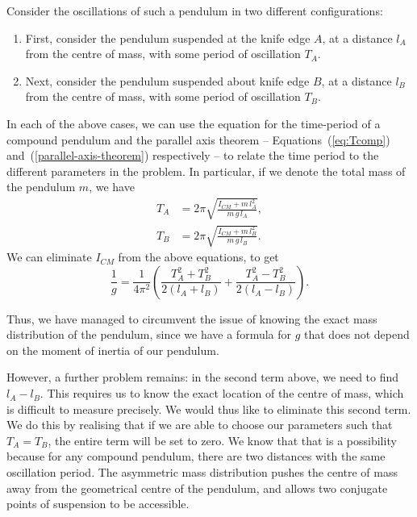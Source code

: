    
Consider the oscillations of such a pendulum in two different configurations:
\vspace{-\parskip}
\begin{enumerate}
    \item First, consider the pendulum suspended at the knife edge $A$, at a distance $l_A$ from the centre of mass, with some period of oscillation $T_A$.
    \item Next, consider the pendulum suspended about knife edge $B$, at a distance $l_B$ from the centre of mass, with some period of oscillation $T_B$.
\end{enumerate}

In each of the above cases, we can use the equation for the time-period of a compound pendulum and the parallel axis theorem -- Equations~(\ref{eq:Tcomp}) and~(\ref{parallel-axis-theorem}) respectively -- to relate the time period to the different parameters in the problem. In particular, if we denote the total mass of the pendulum $m$, we have
\begin{equation}
    \begin{aligned}
    T_A&=2\pi\sqrt{ \frac{I_{CM}+ m\,l_A^2} {m\,g\,l_A} },\\
    T_B&=2\pi\sqrt{ \frac{I_{CM}+ m\,l_B^2} {m\,g\,l_B} }.
    \end{aligned}
\end{equation}
We can eliminate $I_{CM}$ from the above equations, to get
\begin{equation}
    \frac{1}{g}=\frac{1}{4\pi^2} \left(\frac{T_A^2+T_B^2}{ 2(l_A+l_B)}+\frac{T_A^2-T_B^2}{ 2(l_A-l_B)} \right).
    \label{eqn:full-katers-g}
\end{equation}

Thus, we have managed to circumvent the issue of knowing the exact mass distribution of the pendulum, since we have a formula for $g$ that does not depend on the moment of inertia of our pendulum.

However, a further problem remains: in the second term above, we need to find $l_A - l_B$. This requires us to know the exact location of the centre of mass, which is difficult to measure precisely. We would thus like to eliminate this second term. We do this by realising that if we are able to choose our parameters such that $T_A = T_B$, the entire term will be set to zero. We know that that is a possibility because for any compound pendulum, there are two distances with the same oscillation period. The asymmetric mass distribution pushes the centre of mass away from the geometrical centre of the pendulum, and allows two conjugate points of suspension to be accessible.

